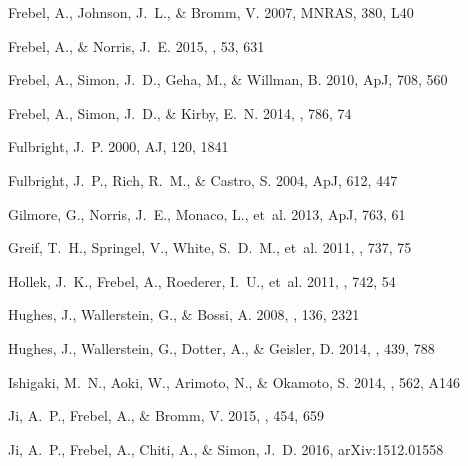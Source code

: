 \documentclass[]{emulateapj}
\begin{document}
\begin{thebibliography}{67}
{Frebel}, A., {Johnson}, J.~L., \& {Bromm}, V. 2007, MNRAS, 380, L40

{Frebel}, A., \& {Norris}, J.~E. 2015, \araa, 53, 631

{Frebel}, A., {Simon}, J.~D., {Geha}, M., \& {Willman}, B. 2010, ApJ, 708, 560

{Frebel}, A., {Simon}, J.~D., \& {Kirby}, E.~N. 2014, \apj, 786, 74

{Fulbright}, J.~P. 2000, AJ, 120, 1841

{Fulbright}, J.~P., {Rich}, R.~M., \& {Castro}, S. 2004, ApJ, 612, 447

{Gilmore}, G., {Norris}, J.~E., {Monaco}, L.,  {et~al.} 2013, ApJ, 763, 61

{Greif}, T.~H., {Springel}, V., {White}, S.~D.~M.,  {et~al.} 2011, \apj, 737,
  75

{Hollek}, J.~K., {Frebel}, A., {Roederer}, I.~U.,  {et~al.} 2011, \apj, 742, 54

{Hughes}, J., {Wallerstein}, G., \& {Bossi}, A. 2008, \aj, 136, 2321

{Hughes}, J., {Wallerstein}, G., {Dotter}, A., \& {Geisler}, D. 2014, \mnras,
  439, 788

{Ishigaki}, M.~N., {Aoki}, W., {Arimoto}, N., \& {Okamoto}, S. 2014, \aap, 562,
  A146

{Ji}, A.~P., {Frebel}, A., \& {Bromm}, V. 2015, \mnras, 454, 659

{Ji}, A.~P., {Frebel}, A., {Chiti}, A., \& {Simon}, J.~D. 2016{},
  arXiv:1512.01558


\end{thebibliography}
\end{document}
